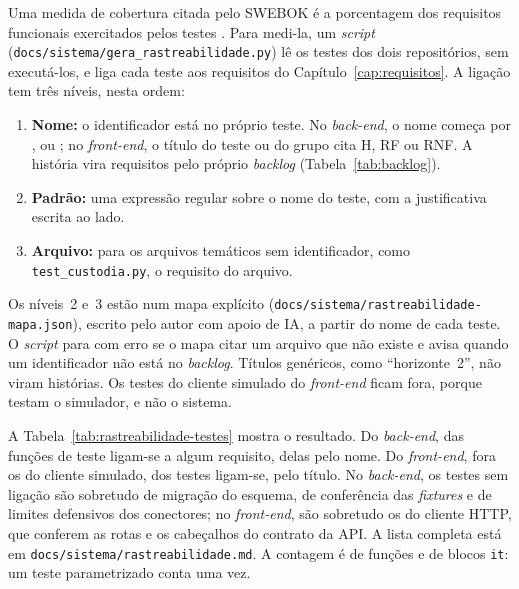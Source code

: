 Uma medida de cobertura citada pelo SWEBOK é a porcentagem dos requisitos
funcionais exercitados pelos testes \cite[cap.~5, seç.~4]{swebok4}. Para
medi-la, um \textit{script} (\texttt{docs/sistema/gera\_rastreabilidade.py})
lê os testes dos dois repositórios, sem executá-los, e liga cada teste aos
requisitos do Capítulo~\ref{cap:requisitos}. A ligação tem três níveis, nesta
ordem:
\begin{enumerate}
	\item \textbf{Nome:} o identificador está no próprio teste. No
	\textit{back-end}, o nome começa por ,
	 ou ; no \textit{front-end}, o
	título do teste ou do grupo cita H, RF ou RNF. A história vira requisitos
	pelo próprio \textit{backlog} (Tabela~\ref{tab:backlog}).
	\item \textbf{Padrão:} uma expressão regular sobre o nome do teste, com a
	justificativa escrita ao lado.
	\item \textbf{Arquivo:} para os arquivos temáticos sem identificador, como
	\texttt{test\_custodia.py}, o requisito do arquivo.
\end{enumerate}
Os níveis~2 e~3 estão num mapa explícito
(\texttt{docs/sistema/rastreabilidade-mapa.json}), escrito pelo autor com
apoio de IA, a partir do nome de cada teste. O \textit{script} para com erro
se o mapa citar um arquivo que não existe e avisa quando um identificador não
está no \textit{backlog}. Títulos genéricos, como ``horizonte~2'', não viram
histórias. Os \rastExcluidos{} testes do cliente simulado do \textit{front-end} ficam fora,
porque testam o simulador, e não o sistema.



A Tabela~\ref{tab:rastreabilidade-testes} mostra o resultado. Do
\textit{back-end}, \rastLigBack{} das \rastTestesBack{} funções de teste
ligam-se a algum requisito, \rastNomeBack{} delas pelo nome. Do
\textit{front-end}, fora os do cliente simulado, \rastLigFront{} dos
\rastElegiveisFront{} testes ligam-se, \rastNomeFront{} pelo título. No
\textit{back-end}, os testes sem ligação são sobretudo de migração do esquema,
de conferência das \textit{fixtures} e de limites defensivos dos conectores;
no \textit{front-end}, são sobretudo os do cliente HTTP, que conferem as rotas
e os cabeçalhos do contrato da API. A lista completa está em
\texttt{docs/sistema/rastreabilidade.md}. A contagem é de funções e de blocos
\texttt{it}: um teste parametrizado conta uma vez.

